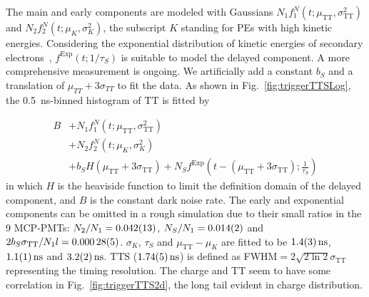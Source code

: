 The main and early components are modeled with Gaussians $N_1f_1^N(t;\mu_{\mathrm{TT}},\sigma_{\mathrm{TT}}^2)$ and $N_2f_2^N(t;\mu_K,\sigma_K^2)$, the subscript $K$ standing for PEs with high kinetic energies. Considering the exponential distribution of kinetic energies of secondary electrons~\cite{Furman,SecondElectron}, $f^\mathrm{Exp}(t;1/\tau_S)$ is suitable to model the delayed component.  A more comprehensive measurement is ongoing.  We artificially add a constant $b_S$ and a translation of $\mu_{TT} + 3\sigma_{TT}$ to fit the data. As shown in Fig.~\ref{fig:triggerTTSLog}, the \SI{0.5}{ns}-binned histogram of $\mathrm{TT}$ is fitted by

\begin{equation}
    \begin{aligned}
        B&+N_1f_1^N(t;\mu_{\mathrm{TT}},\sigma_{\mathrm{TT}}^2)\\
        &+N_2f_2^N(t;\mu_K,\sigma_K^2)\\
        &+b_SH(\mu_{\mathrm{TT}}+3\sigma_{\mathrm{TT}})+N_Sf^{\mathrm{Exp}}\left(t-(\mu_{\mathrm{TT}}+3\sigma_{\mathrm{TT}});\frac{1}{\tau_S}\right)
    \end{aligned}
\end{equation}
in which $H$ is the heaviside function to limit the definition domain of the delayed component, and $B$ is the constant dark noise rate. The early and exponential components can be omitted in a rough simulation due to their small ratios in the 9 MCP-PMTs: $N_2/N_1 = \num{0.042\pm0.013}$, $N_S/N_1 = \num{0.014\pm0.002}$ and $2b_S\sigma_{\mathrm{TT}}/N_1 l= \num{0.00028\pm0.00005}$.  $\sigma_K$, $\tau_S$ and $\mu_{\mathrm{TT}}-\mu_K$ are fitted to be $\SI{1.4 \pm 0.3}{ns}$, $\SI{1.1\pm 0.1}{ns}$ and $\SI{3.2\pm 0.2}{ns}$. TTS ($\SI{1.74\pm0.05}{ns}$) is defined as FWHM$=2\sqrt{2\ln 2}\sigma_{\mathrm{TT}}$~\cite{HAMAMATSUManual} representing the timing resolution. The charge and TT seem to have some correlation in Fig.~\ref{fig:triggerTTS2d}, the long tail evident in charge distribution.


